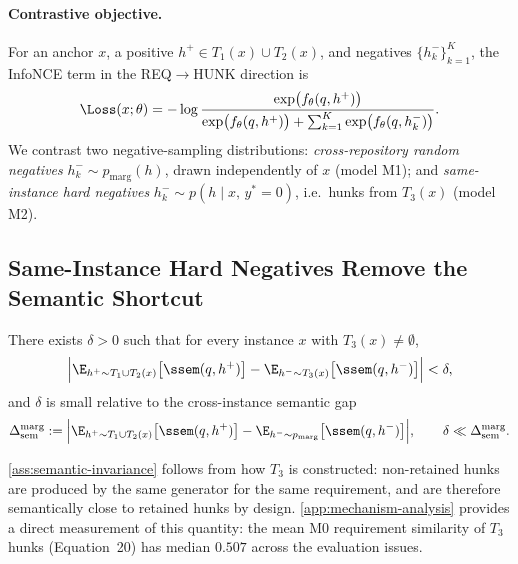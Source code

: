 \paragraph{Contrastive objective.}
For an anchor $x$, a positive $h^+ \in T_1(x) \cup T_2(x)$, and negatives $\{h_k^-\}_{k=1}^{K}$, the InfoNCE term in the REQ$\to$HUNK direction is
\begin{equation}
  \Loss(x;\theta) = -\log \frac{\exp\!\big(f_\theta(q, h^+)\big)}
       {\exp\!\big(f_\theta(q, h^+)\big)
        + \sum_{k=1}^{K} \exp\!\big(f_\theta(q, h_k^-)\big)} .
  \label{eq:infonce}
\end{equation}
We contrast two negative-sampling distributions: \emph{cross-repository random negatives} $h_k^- \sim p_{\mathrm{marg}}(h)$, drawn independently of $x$ (model M1); and \emph{same-instance hard negatives} $h_k^- \sim p(h \mid x,\, y^\ast = 0)$, i.e.\ hunks from $T_3(x)$ (model M2).

\subsection{Same-Instance Hard Negatives Remove the Semantic Shortcut}
\label{app:theory-thm1}

\begin{assumption}
\label{ass:semantic-invariance}
There exists $\delta > 0$ such that for every instance $x$ with $T_3(x) \neq \emptyset$,
\begin{equation}
  \Big| \E_{h^+ \sim T_1 \cup T_2(x)}\big[\ssem(q, h^+)\big] - \E_{h^- \sim T_3(x)}\big[\ssem(q, h^-)\big] \Big| < \delta ,
\end{equation}
and $\delta$ is small relative to the cross-instance semantic gap
\begin{equation}
  \Delta_{\mathrm{sem}}^{\mathrm{marg}} := \Big| \E_{h^+ \sim T_1 \cup T_2(x)}\big[\ssem(q, h^+)\big] - \E_{h^- \sim p_{\mathrm{marg}}}\big[\ssem(q, h^-)\big] \Big| , \qquad \delta \ll \Delta_{\mathrm{sem}}^{\mathrm{marg}} .
\end{equation}
\end{assumption}

\noindent
\cref{ass:semantic-invariance} follows from how $T_3$ is constructed: non-retained hunks are produced by the same generator for the same requirement, and are therefore semantically close to retained hunks by design. \cref{app:mechanism-analysis} provides a direct measurement of this quantity: the mean M0 requirement similarity of $T_3$ hunks (Equation~20) has median $0.507$ across the evaluation issues.

